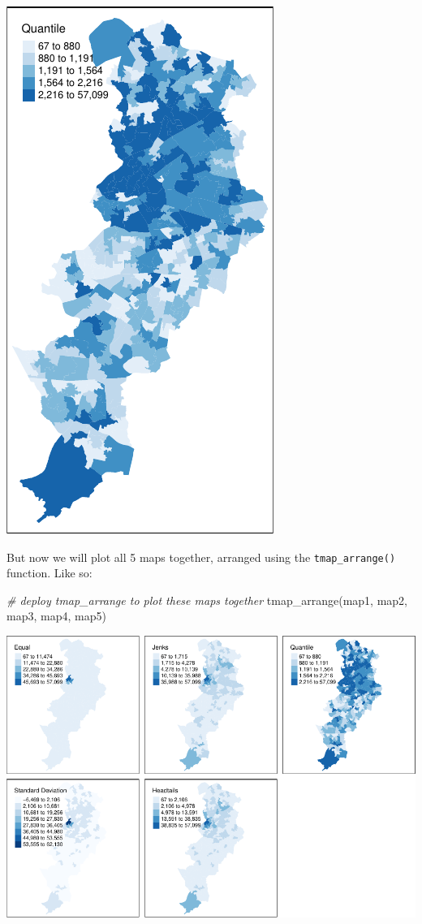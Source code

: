 \documentclass[
]{book}
\makeatletter
\newenvironment{Shaded}{\begin{snugshade}}{\end{snugshade}}
\newcommand{\CommentTok}[1]{\textcolor[rgb]{0.37,0.37,0.37}{\textit{#1}}}
\newcommand{\FunctionTok}[1]{\textcolor[rgb]{0,0,0}{#1}}
\newcommand{\NormalTok}[1]{#1}
\newenvironment{kframe}{%
\medskip{}
\setlength{\fboxsep}{.8em}
 \def\at@end@of@kframe{}%
 \ifinner\ifhmode%
  \def\at@end@of@kframe{\end{minipage}}%
  \begin{minipage}{\columnwidth}%
 \fi\fi%
 \def\FrameCommand##1{\hskip\@totalleftmargin \hskip-\fboxsep
 \colorbox{shadecolor}{##1}\hskip-\fboxsep
     \hskip-\linewidth \hskip-\@totalleftmargin \hskip\columnwidth}%
 \MakeFramed {\advance\hsize-\width
   \@totalleftmargin\z@ \linewidth\hsize
   \@setminipage}}%
 {\par\unskip\endMakeFramed%
 \at@end@of@kframe}
\renewenvironment{Shaded}{\begin{kframe}}{\end{kframe}}
\makeatother
\begin{document}
\includegraphics{crime_mapping_files/figure-latex/unnamed-chunk-100-1.pdf}

But now we will plot all 5 maps together, arranged using the \texttt{tmap\_arrange()} function. Like so:

\begin{Shaded}
\begin{Highlighting}[]
\CommentTok{\# deploy tmap\_arrange to plot these maps together}
\FunctionTok{tmap\_arrange}\NormalTok{(map1, map2, map3, map4, map5) }
\end{Highlighting}
\end{Shaded}

\includegraphics{crime_mapping_files/figure-latex/unnamed-chunk-101-1.pdf}
\end{document}
